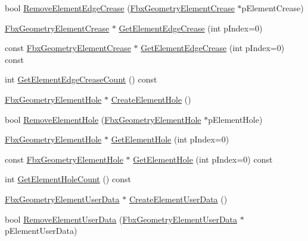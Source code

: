 \begin{DoxyCompactItemize}
\item 
bool \hyperlink{class_fbx_geometry_base_a91216359c824cc80d113e0760d59e9bb}{Remove\+Element\+Edge\+Crease} (\hyperlink{fbxlayer_8h_aa1db71d39153856548f192cf52aa2cc5}{Fbx\+Geometry\+Element\+Crease} $\ast$p\+Element\+Crease)
\item 
\hyperlink{fbxlayer_8h_aa1db71d39153856548f192cf52aa2cc5}{Fbx\+Geometry\+Element\+Crease} $\ast$ \hyperlink{class_fbx_geometry_base_acb7576ed7cf6011f456e6a3d30082058}{Get\+Element\+Edge\+Crease} (int p\+Index=0)
\item 
const \hyperlink{fbxlayer_8h_aa1db71d39153856548f192cf52aa2cc5}{Fbx\+Geometry\+Element\+Crease} $\ast$ \hyperlink{class_fbx_geometry_base_af596440c20b05b92559190449803b8e8}{Get\+Element\+Edge\+Crease} (int p\+Index=0) const
\item 
int \hyperlink{class_fbx_geometry_base_aeafa5b8ecd4a424003624e2e35978033}{Get\+Element\+Edge\+Crease\+Count} () const
\item 
\hyperlink{fbxlayer_8h_ac66f768aa149c016447f88213c374e25}{Fbx\+Geometry\+Element\+Hole} $\ast$ \hyperlink{class_fbx_geometry_base_a2c30734fb6ff6bb93adadd35978fc146}{Create\+Element\+Hole} ()
\item 
bool \hyperlink{class_fbx_geometry_base_a26484bbcc3f5a76366fcbe7352c8fefa}{Remove\+Element\+Hole} (\hyperlink{fbxlayer_8h_ac66f768aa149c016447f88213c374e25}{Fbx\+Geometry\+Element\+Hole} $\ast$p\+Element\+Hole)
\item 
\hyperlink{fbxlayer_8h_ac66f768aa149c016447f88213c374e25}{Fbx\+Geometry\+Element\+Hole} $\ast$ \hyperlink{class_fbx_geometry_base_af4daaf3e4a61bfd482d70d41d0a9e350}{Get\+Element\+Hole} (int p\+Index=0)
\item 
const \hyperlink{fbxlayer_8h_ac66f768aa149c016447f88213c374e25}{Fbx\+Geometry\+Element\+Hole} $\ast$ \hyperlink{class_fbx_geometry_base_a503d850eaaed9c21457cf19b86080f14}{Get\+Element\+Hole} (int p\+Index=0) const
\item 
int \hyperlink{class_fbx_geometry_base_a93f4c298785352d3a8e05596d31d0760}{Get\+Element\+Hole\+Count} () const
\item 
\hyperlink{fbxlayer_8h_acef498b248e323a189b5ccbf478b0b41}{Fbx\+Geometry\+Element\+User\+Data} $\ast$ \hyperlink{class_fbx_geometry_base_a457a8982320b3637353051aaec987c90}{Create\+Element\+User\+Data} ()
\item 
bool \hyperlink{class_fbx_geometry_base_abf8c753f38229a2b076ec20a17da6807}{Remove\+Element\+User\+Data} (\hyperlink{fbxlayer_8h_acef498b248e323a189b5ccbf478b0b41}{Fbx\+Geometry\+Element\+User\+Data} $\ast$p\+Element\+User\+Data)

\end{DoxyCompactItemize}
